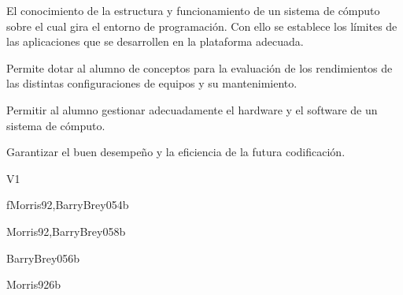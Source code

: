 \begin{syllabus}


\begin{justification}
El conocimiento de la estructura y funcionamiento de un sistema de cómputo sobre el cual gira el entorno de programación. Con ello se establece los límites de las aplicaciones que se desarrollen en la plataforma adecuada.

Permite dotar al alumno de conceptos para la evaluación de los rendimientos de las distintas configuraciones de equipos y su mantenimiento.
\end{justification}

\begin{goals}
\item Permitir al alumno gestionar adecuadamente el hardware y el software de un sistema de cómputo.
\item Garantizar el buen desempeño y la eficiencia de la futura codificación.
\end{goals}

\begin{outcomes}{V1}
    \item {}
    \item {}
\end{outcomes}

\begin{unit}{f\ARDigitallogicanddigitalsystems}{}{Morris92,BarryBrey05}{4}{b}
    \ARDigitallogicanddigitalsystemsAllTopics
    \ARDigitallogicanddigitalsystemsAllLearningOutcomes
\end{unit}

\begin{unit}{\ARMemorysystemorganizationandarchitecture}{}{Morris92,BarryBrey05}{8}{b}
    \ARMemorysystemorganizationandarchitectureAllTopics
    \ARMemorysystemorganizationandarchitectureAllLearningOutcomes
\end{unit}

\begin{unit}{\ARInterfacingandcommunication}{}{BarryBrey05}{6}{b}
    \ARInterfacingandcommunicationAllTopics
    \ARInterfacingandcommunicationAllLearningOutcomes
\end{unit}

\begin{unit}{\ARFunctionalorganization}{}{Morris92}{6}{b}
     \ARFunctionalorganizationAllTopics
     \ARFunctionalorganizationAllLearningOutcomes
\end{unit}


\end{syllabus}
